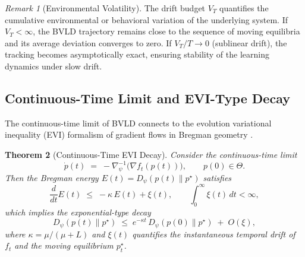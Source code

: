 \documentclass[11pt]{article}
\theoremstyle{plain}
\newtheorem{theorem}{Theorem}[section]
\theoremstyle{definition}
\theoremstyle{remark}
\newtheorem{remark}[theorem]{Remark}
\begin{document}
\begin{remark}[Environmental Volatility]
\label{rem:volatility}
The drift budget $V_T$ quantifies the cumulative
environmental or behavioral variation of the underlying system.
If $V_T<\infty$, the BVLD trajectory
remains close to the sequence of moving equilibria
and its average deviation converges to zero.
If $V_T/T\to0$ (sublinear drift),
the tracking becomes asymptotically exact,
ensuring stability of the learning dynamics under slow drift.
\end{remark}


\subsection{Continuous-Time Limit and EVI-Type Decay}

The continuous-time limit of BVLD connects to 
the evolution variational inequality (EVI) formalism 
of gradient flows in Bregman geometry 
\cite{Ambrosio2008,Wibisono2016,Bolte2018,Lu2021}.

\begin{theorem}[Continuous-Time EVI Decay]
\label{thm:evi}
Consider the continuous-time limit
\begin{equation}
\dot p(t)
\;=\;
-\nabla_{\!\psi}^{-1}\big(\nabla f_t(p(t))\big),
\qquad
p(0)\in\Theta.
\label{eq:flow}
\end{equation}
Then the Bregman energy $E(t)=D_\psi(p(t)\|p^\star)$ satisfies
\begin{equation}
\frac{d}{dt}E(t)
\;\le\;
-\kappa\,E(t)+\xi(t),
\qquad
\int_{0}^{\infty}\xi(t)\,dt<\infty,
\label{eq:evi}
\end{equation}
which implies the exponential-type decay
\begin{equation}
D_\psi(p(t)\|p^\star)
\;\le\;
e^{-\kappa t}\,D_\psi(p(0)\|p^\star)
\;+\;O(\xi),
\label{eq:evi-decay}
\end{equation}
where $\kappa=\mu/(\mu+L)$ and $\xi(t)$ quantifies the instantaneous temporal drift of $f_t$ and the moving equilibrium $p_t^\star$.
\end{theorem}
\end{document}
